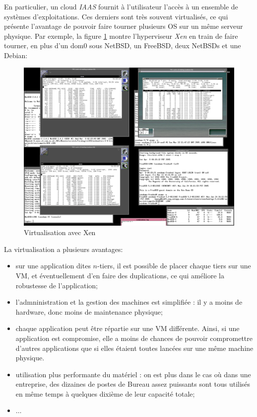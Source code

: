 \documentclass[a4paper]{article}
\begin{document}
En particulier, un cloud \textit{IAAS} fournit à l'utilisateur l'accès
à un ensemble de systèmes d'exploitations. Ces derniers sont très
souvent virtualisés, ce qui présente l'avantage de pouvoir faire tourner
plusieurs OS sur un même serveur physique. Par exemple, la figure
\ref{hubertfxen} montre l'hyperviseur \textit{Xen} en train de faire
tourner, en plus d'un dom$0$ sous NetBSD, un FreeBSD, deux NetBSDs et
une Debian:
\begin{figure}[!ht]
	\centering
	\includegraphics[scale=.2]{imgs/hubertf-xen.png}
	\caption{\label{hubertfxen} Virtualisation avec Xen}
\end{figure}

La virtualisation a plusieurs avantages:
\begin{itemize}
	\item sur une application dites $n$-tiers, il est possible
	de placer chaque tiers sur une VM, et éventuellement d'en faire
	des duplications, ce qui améliore la robustesse de l'application;
	\item l'admninistration et la gestion des machines est simplifiée :
	il y a moins de hardware, donc moins de maintenance physique;
	\item chaque application peut être répartie sur une VM différente.
	Ainsi, si une application est compromise, elle a moins de chances
	de pouvoir compromettre d'autres applications que si elles étaient
	toutes lancées sur une même machine physique.
	\item utilisation plus performante du matériel : on est plus dans
	le cas où dans une entreprise, des dizaines de postes de Bureau
	\og assez \fg puissants sont tous utilisés en même temps à quelques
	dixième de leur capacité totale;
	\item $\ldots$
\end{itemize}
\end{document}
